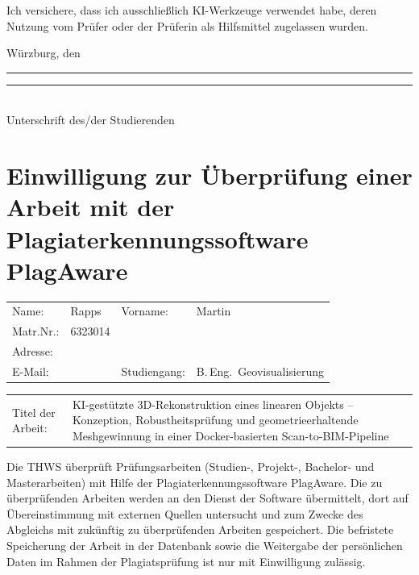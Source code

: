 \documentclass[12pt,a4paper]{article}
\newif\ifanonym
\begin{document}
Ich versichere, dass ich ausschließlich KI-Werkzeuge verwendet habe, deren
Nutzung vom Prüfer oder der Prüferin als Hilfsmittel zugelassen wurden.

\vfill
\noindent Würzburg, den \rule{4cm}{0.4pt}\hfill
\rule{6cm}{0.4pt}\\
\hfill Unterschrift des/der Studierenden
\clearpage
\ifanonym\else
\section*{Einwilligung zur Überprüfung einer Arbeit mit der
Plagiaterkennungssoftware PlagAware}

\vspace{0.5em}
\noindent\begin{tabular}{@{}p{2.0cm}p{4.2cm}p{3.0cm}l@{}}
Name: & Rapps & Vorname: & Martin\\[0.4em]
Matr.Nr.: & 6323014 & & \\[0.4em]
Adresse: & \dotfill & & \\[0.4em]
E-Mail: & \dotfill & Studiengang: & B.\,Eng.\ Geovisualisierung\\
\end{tabular}

\vspace{0.4em}
\noindent\begin{tabular}{@{}p{2.2cm}p{10.8cm}@{}}
Titel der Arbeit: & KI-gestützte 3D-Rekonstruktion eines linearen Objekts --
Konzeption, Robustheitsprüfung und geometrieerhaltende Meshgewinnung in einer
Docker-basierten Scan-to-BIM-Pipeline\\
\end{tabular}

\vspace{0.8em}
Die THWS überprüft Prüfungsarbeiten (Studien-, Projekt-, Bachelor- und
Masterarbeiten) mit Hilfe der Plagiaterkennungssoftware PlagAware. Die zu
überprüfenden Arbeiten werden an den Dienst der Software übermittelt, dort auf
Übereinstimmung mit externen Quellen untersucht und zum Zwecke des Abgleichs
mit zukünftig zu überprüfenden Arbeiten gespeichert. Die befristete Speicherung
der Arbeit in der Datenbank sowie die Weitergabe der persönlichen Daten im
Rahmen der Plagiatsprüfung ist nur mit Einwilligung zulässig.

\vspace{0.4em}
\noindent{}
\end{document}
